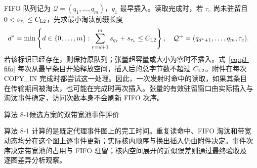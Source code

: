 FIFO 队列记为 $\mathcal Q=(q_1,\ldots,q_m)$，$q_1$ 最早插入。读取完成时，若 $\tau_e$ 尚未驻留且 $0<s_{\tau_e}\le C_{\rm L2}$，先求最小淘汰前缀长度
\begin{equation}
d^*=\min\left\{d\in\{0,\ldots,m\}:\sum_{r=d+1}^{m}s_{q_r}+s_{\tau_e}\le C_{\rm L2}\right\},
\quad \mathcal Q^+=(q_{d^*+1},\ldots,q_m,\tau_e).
\label{eq:q3-fifo}
\end{equation}
若该标识已经存在，则保持原队列；张量超容量或大小为零时不插入。式~\eqref{eq:q3-fifo} 每次从最早条目开始释放空间，插入后的总字节数不超过 $C_{\rm L2}$。附件在每次 COPY\_IN 完成时都尝试这一处理。因此，一次发射时命中的读取，如果其条目在传输期间被淘汰，也可能在完成时再次插入。张量的有效驻留窗口由实际插入与淘汰事件确定，访问次数本身不会刷新 FIFO 次序。

\begin{algorithmblock}{算法 8-1\quad 候选方案的双带宽池事件评价}
\end{algorithmblock}

算法 8-1 计算的是既定代理事件图上的完工时间。重复读命中、FIFO 淘汰和带宽动态均分在这个图上逐事件更新；实际核内顺序与换出插入仍由附件决定。事件次序决定带宽池的占用与 FIFO 驻留；核内空间展开的近似误差则通过最终验收及逐图差异分析观察。

